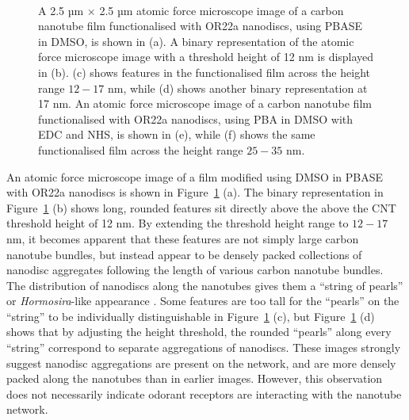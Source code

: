 \documentclass[
  a4paper,
]{scrbook}
\begin{document}
\begin{figure}
\begin{minipage}[t]{0.01\linewidth}
{\centering 

~

}

\end{minipage}%

\caption[A 2.5 µm \(\times\) 2.5 µm atomic force microscope image of a
carbon nanotube film functionalised with OR22a nanodiscs using PBASE in
DMSO, with masking and binary representations used to indicate substrate
and nanodisc heights.]{\label{fig-DMSO-AFM-comparison}A 2.5 µm
\(\times\) 2.5 µm atomic force microscope image of a carbon nanotube
film functionalised with OR22a nanodiscs, using PBASE in DMSO, is shown
in (a). A binary representation of the atomic force microscope image
with a threshold height of 12 nm is displayed in (b). (c) shows features
in the functionalised film across the height range \(12-17\) nm, while
(d) shows another binary representation at 17 nm. An atomic force
microscope image of a carbon nanotube film functionalised with OR22a
nanodiscs, using PBA in DMSO with EDC and NHS, is shown in (e), while
(f) shows the same functionalised film across the height range \(25-35\)
nm.}

\end{figure}

An atomic force microscope image of a film modified using DMSO in PBASE
with OR22a nanodiscs is shown in Figure~\ref{fig-DMSO-AFM-comparison}
(a). The binary representation in Figure~\ref{fig-DMSO-AFM-comparison}
(b) shows long, rounded features sit directly above the above the CNT
threshold height of 12 nm. By extending the threshold height range to
\(12-17\) nm, it becomes apparent that these features are not simply
large carbon nanotube bundles, but instead appear to be densely packed
collections of nanodisc aggregates following the length of various
carbon nanotube bundles. The distribution of nanodiscs along the
nanotubes gives them a ``string of pearls'' or \emph{Hormosira}-like
appearance \autocite{NewZealandPlantConservationNetwork}. Some features
are too tall for the ``pearls'' on the ``string'' to be individually
distinguishable in Figure~\ref{fig-DMSO-AFM-comparison} (c), but
Figure~\ref{fig-DMSO-AFM-comparison} (d) shows that by adjusting the
height threshold, the rounded ``pearls'' along every ``string''
correspond to separate aggregations of nanodiscs. These images strongly
suggest nanodisc aggregations are present on the network, and are more
densely packed along the nanotubes than in earlier images. However, this
observation does not necessarily indicate odorant receptors are
interacting with the nanotube network.
\end{document}
